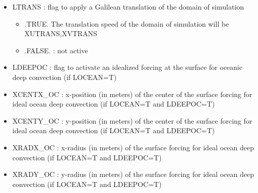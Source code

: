 \begin{itemize}
\item LTRANS : flag to apply a Galilean translation of the domain 
of simulation
\begin{itemize}
\item  .TRUE. The translation speed of the domain of simulation will be 
XUTRANS,XVTRANS
\item .FALSE. : not active
\end{itemize}

\item LDEEPOC : flag to activate an idealized forcing at the surface for oceanic deep convection (if LOCEAN=T)

\item XCENTX\_OC : x-position (in meters) of the center of the surface forcing for ideal ocean deep convection (if LOCEAN=T and LDEEPOC=T)

\item XCENTY\_OC : y-position (in meters) of the center of the surface forcing for ideal ocean deep convection (if LOCEAN=T and LDEEPOC=T)

\item XRADX\_OC : x-radius (in meters) of the surface forcing for ideal ocean deep convection (if LOCEAN=T and LDEEPOC=T)

\item XRADY\_OC : y-radius (in meters) of the surface forcing for ideal ocean deep convection (if LOCEAN=T and LDEEPOC=T)

\end{itemize}
